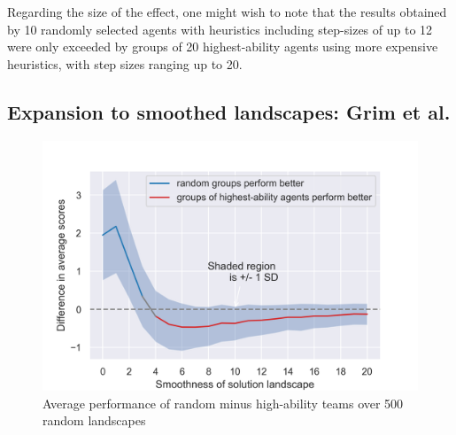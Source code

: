 Regarding the size of the effect, one might wish to note that the results obtained by 10 randomly selected agents with heuristics including step-sizes of up to 12 were only exceeded by groups of 20 highest-ability agents using more expensive heuristics, with step sizes ranging up to 20. 
    
\subsection{Expansion to smoothed landscapes: Grim et al.}

\begin{figure}
    \includegraphics[width=\linewidth]{Fig2.png}
    \caption{Average performance of random minus high-ability teams over 500 random landscapes}
    \label{fig:Grim2}
  \end{figure}
 
